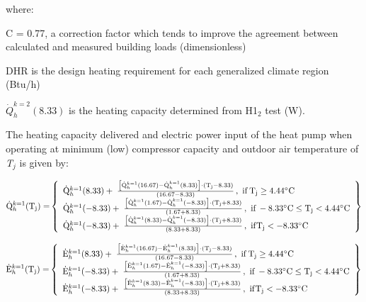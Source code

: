 where:

C = 0.77, a correction factor which tends to improve the agreement between calculated and measured building loads (dimensionless)

DHR is the design heating requirement for each generalized climate region (Btu/h)

\(\dot Q_h^{k = 2}(8.33)\) is the heating capacity determined from H1\(_{2}\) test (W).

The heating capacity delivered and electric power input of the heat pump when operating at minimum (low) compressor capacity and outdoor air temperature of \emph{T\(_{j}\)} is given by:

\begin{equation}
{\rm{\dot Q}}_h^{k = 1}{\rm{(}}{{\rm{T}}_{\rm{j}}}{\rm{) = }}\left\{ 
    \begin{array}{l}
      {\rm{\dot Q}}_h^{k = 1}(8.33) + \;\frac{{\left[ {{\rm{\dot Q}}_h^{k = 1}{\rm{(16}}{\rm{.67) - \dot Q}}_h^{k = 1}{\rm{(8}}{\rm{.33)}}} \right] \cdot \left( {{{\rm{T}}_{\rm{j}}} - 8.33} \right)}}{{\left( {16.67 - 8.33} \right)}}\,{\rm{,~if }}\,{{\rm{T}}_{\rm{j}}} \ge 4.44{\rm{^\circ C}} \\
      {\rm{\dot Q}}_h^{k = 1}( - 8.33) + \;\frac{{\left[ {{\rm{\dot Q}}_h^{k = 1}{\rm{(1}}{\rm{.67) - \dot Q}}_h^{k = 1}{\rm{( - 8}}{\rm{.33)}}} \right] \cdot \left( {{{\rm{T}}_{\rm{j}}} + 8.33} \right)}}{{\left( {1.67 + 8.33} \right)}}\,{\rm{,~if }}\, - 8.33{\rm{^\circ C}} \le {{\rm{T}}_{\rm{j}}} < 4.44{\rm{^\circ C}} \\
      {\rm{\dot Q}}_h^{k = 1}( - 8.33) + \;\frac{{\left[ {{\rm{\dot Q}}_h^{k = 1}{\rm{(8}}{\rm{.33) - \dot Q}}_h^{k = 1}{\rm{( - 8}}{\rm{.33)}}} \right] \cdot \left( {{{\rm{T}}_{\rm{j}}} + 8.33} \right)}}{{\left( {8.33 + 8.33} \right)}}\,{\rm{,~if }}{{\rm{T}}_{\rm{j}}} <  - 8.33{\rm{^\circ C}}\,
    \end{array}
  \right\}
\end{equation}

\begin{equation}
{\rm{\dot E}}_h^{k = 1}{\rm{(}}{{\rm{T}}_{\rm{j}}}{\rm{) = }}\left\{
    \begin{array}{l}
      {\rm{\dot E}}_h^{k = 1}(8.33) + \;\frac{{\left[ {{\rm{\dot E}}_h^{k = 1}{\rm{(16}}{\rm{.67) - \dot E}}_h^{k = 1}{\rm{(8}}{\rm{.33)}}} \right] \cdot \left( {{{\rm{T}}_{\rm{j}}} - 8.33} \right)}}{{\left( {16.67 - 8.33} \right)}}\,{\rm{,~if }}\,{{\rm{T}}_{\rm{j}}} \ge 4.44{\rm{^\circ C}} \\
      {\rm{\dot E}}_h^{k = 1}( - 8.33) + \;\frac{{\left[ {{\rm{\dot E}}_h^{k = 1}{\rm{(1}}{\rm{.67) - \dot E}}_h^{k = 1}{\rm{( - 8}}{\rm{.33)}}} \right] \cdot \left( {{{\rm{T}}_{\rm{j}}} + 8.33} \right)}}{{\left( {1.67 + 8.33} \right)}}\,{\rm{,~if }}\, - 8.33{\rm{^\circ C}} \le {{\rm{T}}_{\rm{j}}} < 4.44{\rm{^\circ C}} \\
      {\rm{\dot E}}_h^{k = 1}( - 8.33) + \;\frac{{\left[ {{\rm{\dot E}}_h^{k = 1}{\rm{(8}}{\rm{.33) - \dot E}}_h^{k = 1}{\rm{( - 8}}{\rm{.33)}}} \right] \cdot \left( {{{\rm{T}}_{\rm{j}}} + 8.33} \right)}}{{\left( {8.33 + 8.33} \right)}}\,{\rm{,~if }}{{\rm{T}}_{\rm{j}}} <  - 8.33{\rm{^\circ C}}\,
    \end{array}
  \right\}
\end{equation}


